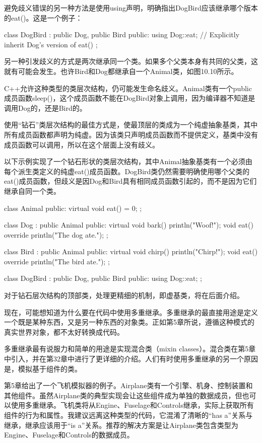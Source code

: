 避免歧义错误的另一种方法是使用using声明，明确指出DogBird应该继承哪个版本的eat()。这是一个例子：

\begin{cpp}
class DogBird : public Dog, public Bird
{
    public:
        using Dog::eat; // Explicitly inherit Dog's version of eat()
};
\end{cpp}


另一种引发歧义的方式是两次继承同一个类。如果多个父类本身有共同的父类，这就有可能会发生。也许Bird和Dog都继承自一个Animal类，如图10.10所示。


C++允许这种类型的类层次结构，仍可能发生命名歧义。Animal类有一个public成员函数sleep()，这个成员函数不能在DogBird对象上调用，因为编译器不知道是调用Dog的，还是Bird的。

使用“钻石”类层次结构的最佳方式是，使最顶层的类成为一个纯虚抽象基类，其中所有成员函数都声明为纯虚。因为该类只声明成员函数而不提供定义，基类中没有成员函数可以调用，所以在这个层面上没有歧义。

以下示例实现了一个钻石形状的类层次结构，其中Animal抽象基类有一个必须由每个派生类定义的纯虚eat()成员函数。DogBird类仍然需要明确使用哪个父类的eat()成员函数，但歧义是因Dog和Bird具有相同成员函数引起的，而不是因为它们继承自同一个类。

\begin{cpp}
class Animal
{
    public:
        virtual void eat() = 0;
};

class Dog : public Animal
{
    public:
        virtual void bark() { println("Woof!"); }
        void eat() override { println("The dog ate."); }
};

class Bird : public Animal
{
    public:
        virtual void chirp() { println("Chirp!"); }
        void eat() override { println("The bird ate."); }
};

class DogBird : public Dog, public Bird
{
    public:
        using Dog::eat;
};
\end{cpp}

对于钻石层次结构的顶部类，处理更精细的机制，即虚基类，将在后面介绍。


现在，可能想知道为什么要在代码中使用多重继承。多重继承的最直接用途是定义一个既是某种东西，又是另一种东西的对象类。正如第5章所说，遵循这种模式的真实世界对象，都不太好转换成代码。

多重继承最有说服力和简单的用途是实现混合类（mixin classes）。混合类在第5章中引入，并在第32章中进行了更详细的介绍。人们有时使用多重继承的另一个原因是，模拟基于组件的类。

第5章给出了一个飞机模拟器的例子。Airplane类有一个引擎、机身、控制装置和其他组件。虽然Airplane类的典型实现会让这些组件成为单独的数据成员，但也可以使用多重继承。飞机类将从Engine、Fuselage和Controls继承，实际上获取所有组件的行为和属性。我建议远离这种类型的代码，它混淆了清晰的“has a”关系与继承，继承应该用于“is a”关系。推荐的解决方案是让Airplane类包含类型为Engine、Fuselage和Controls的数据成员。

